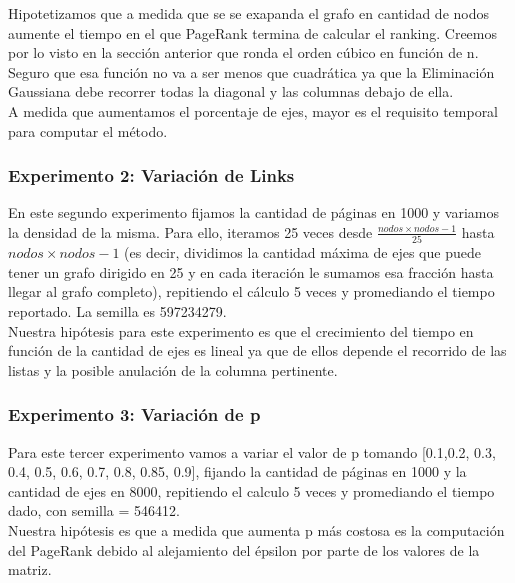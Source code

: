 Hipotetizamos que a medida que se se exapanda el grafo en cantidad de nodos aumente el tiempo en el que PageRank termina de calcular el ranking. Creemos por lo visto en la sección anterior que ronda el orden cúbico en función de n. Seguro que esa función no va a ser menos que cuadrática ya que la Eliminación Gaussiana debe recorrer todas la diagonal y las columnas debajo de ella. \\

A medida que aumentamos el porcentaje de ejes, mayor es el requisito temporal para computar el método. \\ 

\subsubsection{Experimento 2: Variación de Links}
En este segundo experimento fijamos la cantidad de páginas en 1000 y variamos la densidad de la misma. Para ello, iteramos 25 veces desde $\frac{nodos \times nodos-1}{25}$ hasta $nodos \times nodos-1$ (es decir, dividimos la cantidad máxima de ejes que puede tener un grafo dirigido en 25 y en cada iteración le sumamos esa fracción hasta llegar al grafo completo), repitiendo el cálculo 5 veces y promediando el tiempo reportado. La semilla es 597234279. \\

Nuestra hipótesis para este experimento es que el crecimiento del tiempo en función de la cantidad de ejes es lineal ya que de ellos depende el recorrido de las listas y la posible anulación de la columna pertinente. \\

\subsubsection{Experimento 3: Variación de p}
Para este tercer experimento vamos a variar el valor de p tomando [0.1,0.2, 0.3, 0.4, 0.5, 0.6, 0.7, 0.8, 0.85, 0.9], fijando la cantidad de páginas en 1000 y la cantidad de ejes en 8000, repitiendo el calculo 5 veces y promediando el tiempo dado, con semilla = 546412. \\



Nuestra hipótesis es que a medida que aumenta p más costosa es la computación del PageRank debido al alejamiento del épsilon por parte de los valores de la matriz. \\

